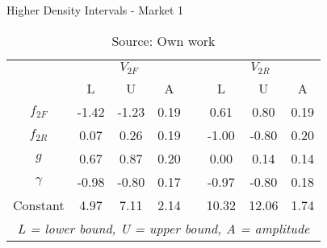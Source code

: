 \begin{table}[H]
\caption{Higher Density Intervals -  Market 1}
\centering
\begin{tabular}{cccccccc}
  \toprule
& \multicolumn{3}{c}{$V_{2F}$} && \multicolumn{3}{c}{$V_{2R}$}\\ 
\cline{2-4} \cline{6-8}
            & L  & U   & A &&  L  & U   & A\\
  \hline
  $f_{2F}$  & -1.42 & -1.23  & 0.19 && 0.61  & 0.80 & 0.19 \\ 
  $f_{2R}$  & 0.07  & 0.26   & 0.19 && -1.00 & -0.80 & 0.20 \\ 
  $g$       & 0.67  & 0.87   & 0.20 && 0.00  & 0.14 & 0.14 \\ 
  $\gamma$  & -0.98 & -0.80  & 0.17 && -0.97 & -0.80 & 0.18 \\ 
  Constant  & 4.97  & 7.11   & 2.14 && 10.32 & 12.06 & 1.74 \\ 
  \hline
  \multicolumn{8}{c}{\textit{L = lower bound, U = upper bound, A = amplitude}}\\
  \bottomrule
 \end{tabular}
\caption*{Source: Own work}
\end{table}